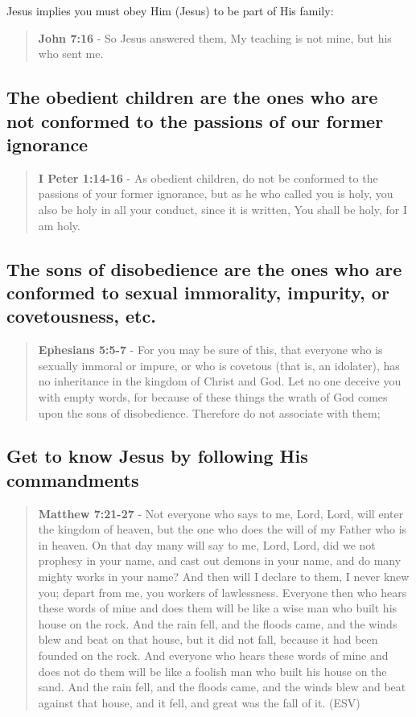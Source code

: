 \documentclass[11pt]{article}
\begin{document}
Jesus implies you must obey Him (Jesus) to be part of His family:

\begin{quote}
\textbf{John 7:16} - So Jesus answered them, My teaching is not mine, but his who sent me.
\end{quote}

\subsection{The obedient children are the ones who are not conformed to the passions of our former ignorance}
\label{sec:org3d95d69}
\begin{quote}
\textbf{I Peter 1:14-16} - As obedient children, do not be conformed to the passions of your former ignorance, but as he who called you is holy, you also be holy in all your conduct, since it is written, You shall be holy, for I am holy.
\end{quote}

\subsection{The sons of disobedience are the ones who are conformed to sexual immorality, impurity, or covetousness, etc.}
\label{sec:org93ad712}
\begin{quote}
\textbf{Ephesians 5:5-7} - For you may be sure of this, that everyone who is sexually immoral or impure, or who is covetous (that is, an idolater), has no inheritance in the kingdom of Christ and God. Let no one deceive you with empty words, for because of these things the wrath of God comes upon the sons of disobedience. Therefore do not associate with them;
\end{quote}

\subsection{Get to know Jesus by following His commandments}
\label{sec:org9d99226}
\begin{quote}
\textbf{Matthew 7:21-27} - Not everyone who says to me, Lord, Lord, will enter the kingdom of heaven, but the one who does the will of my Father who is in heaven.  On that day many will say to me, Lord, Lord, did we not prophesy in your name, and cast out demons in your name, and do many mighty works in your name?  And then will I declare to them, I never knew you; depart from me, you workers of lawlessness.  Everyone then who hears these words of mine and does them will be like a wise man who built his house on the rock.  And the rain fell, and the floods came, and the winds blew and beat on that house, but it did not fall, because it had been founded on the rock.  And everyone who hears these words of mine and does not do them will be like a foolish man who built his house on the sand.  And the rain fell, and the floods came, and the winds blew and beat against that house, and it fell, and great was the fall of it. (ESV)
\end{quote}
\end{document}
